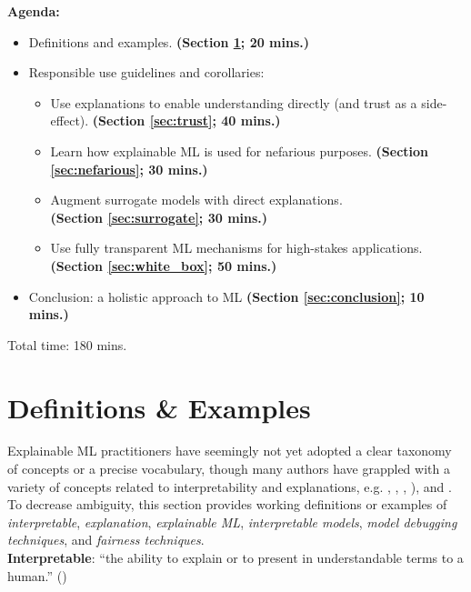 \documentclass[sigconf]{acmart}
\begin{document}
\vspace{-8pt}
\noindent \textbf{Agenda:}
\begin{itemize}
\item Definitions and examples. \textbf{(Section \ref{sec:intro}; 20 mins.)}
\item Responsible use guidelines and corollaries:
\begin{itemize}
	\item Use explanations to enable understanding directly (and trust as a side-effect). \textbf{(Section \ref{sec:trust}; 40 mins.)}
	\item Learn how explainable ML is used for nefarious purposes. \textbf{(Section \ref{sec:nefarious}; 30 mins.)}
	\item Augment surrogate models with direct explanations.\\\textbf{(Section \ref{sec:surrogate}; 30 mins.)}
	\item Use fully transparent ML mechanisms for high-stakes applications. \textbf{(Section \ref{sec:white_box}; 50 mins.)}
\end{itemize}
\item Conclusion: a holistic approach to ML \textbf{(Section \ref{sec:conclusion}; 10 mins.)}
\end{itemize}
\noindent Total time: 180 mins.

\section{Definitions \& Examples} \label{sec:intro}

Explainable ML practitioners have seemingly not yet adopted a clear taxonomy of concepts or a precise vocabulary, though many authors have grappled with a variety of concepts related to interpretability and explanations, e.g. \citet{guidotti2018survey}, \citet{lipton1}, \citet{molnar}, \citet{murdoch2019interpretable}), and \citet{weller2017challenges}. To decrease ambiguity, this section provides working definitions or examples of \textit{interpretable}, \textit{explanation}, \textit{explainable ML}, \textit{interpretable models}, \textit{model debugging techniques}, and \textit{fairness techniques}.\\

\vspace{-8pt}
\noindent\textbf{Interpretable}: ``the ability to explain or to present in understandable terms to a human.'' (\citet{been_kim1})\\
\end{document}
